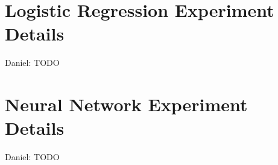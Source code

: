 \documentclass{article}
\begin{document}
\section{Logistic Regression Experiment Details}\label{app:logistic}

{\color{blue}
Daniel: TODO
}

\section{Neural Network Experiment Details}\label{app:nnet}

{\color{blue}
Daniel: TODO
}

\end{document}
